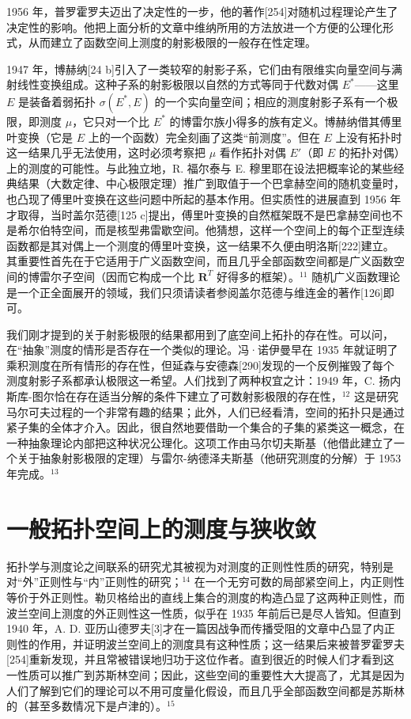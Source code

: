 1956 年，普罗霍罗夫迈出了决定性的一步，他的著作{[}254{]}对随机过程理论产生了决定性的影响。他把上面分析的文章中维纳所用的方法放进一个方便的公理化形式，从而建立了函数空间上测度的射影极限的一般存在性定理。

1947 年，博赫纳{[}24 b{]}引入了一类较窄的射影子系，它们由有限维实向量空间与满射线性变换组成。这种子系的射影极限以自然的方式等同于代数对偶 \(E^*\)——这里 \(E\) 是装备着弱拓扑 \(\sigma(E^*, E)\) 的一个实向量空间；相应的测度射影子系有一个极限，即测度 \(\mu\)，它只对一个比 \(E^*\) 的博雷尔族小得多的族有定义。博赫纳借其傅里叶变换（它是 \(E\) 上的一个函数）完全刻画了这类“前测度”。但在 \(E\) 上没有拓扑时这一结果几乎无法使用，这时必须考察把 \(\mu\) 看作拓扑对偶 \(E'\)（即 \(E\) 的拓扑对偶）上的测度的可能性。与此独立地，R. 福尔泰与 E. 穆里耶在设法把概率论的某些经典结果（大数定律、中心极限定理）推广到取值于一个巴拿赫空间的随机变量时，也凸现了傅里叶变换在这些问题中所起的基本作用。但实质性的进展直到 1956 年才取得，当时盖尔范德{[}125 c{]}提出，傅里叶变换的自然框架既不是巴拿赫空间也不是希尔伯特空间，而是核型弗雷歇空间。他猜想，这样一个空间上的每个正型连续函数都是其对偶上一个测度的傅里叶变换，这一结果不久便由明洛斯{[}222{]}建立。其重要性首先在于它适用于广义函数空间，而且几乎全部函数空间都是广义函数空间的博雷尔子空间（因而它构成一个比 \(\mathbf{R}^T\) 好得多的框架）。\(^{11}\) 随机广义函数理论是一个正全面展开的领域，我们只须请读者参阅盖尔范德与维连金的著作{[}126{]}即可。

我们刚才提到的关于射影极限的结果都用到了底空间上拓扑的存在性。可以问，在“抽象”测度的情形是否存在一个类似的理论。冯·诺伊曼早在 1935 年就证明了乘积测度在所有情形的存在性，但延森与安德森{[}290{]}发现的一个反例摧毁了每个测度射影子系都承认极限这一希望。人们找到了两种权宜之计：1949 年，C. 扬内斯库-图尔恰在存在适当分解的条件下建立了可数射影极限的存在性，\(^{12}\) 这是研究马尔可夫过程的一个非常有趣的结果；此外，人们已经看清，空间的拓扑只是通过紧子集的全体才介入。因此，很自然地要借助一个集合的子集的紧类这一概念，在一种抽象理论内部把这种状况公理化。这项工作由马尔切夫斯基（他借此建立了一个关于抽象射影极限的定理）与雷尔-纳德泽夫斯基（他研究测度的分解）于 1953 年完成。\(^{13}\)

\section*{一般拓扑空间上的测度与狭收敛}
{}

拓扑学与测度论之间联系的研究尤其被视为对测度的正则性性质的研究，特别是对“外”正则性与“内”正则性的研究；\(^{14}\) 在一个无穷可数的局部紧空间上，内正则性等价于外正则性。勒贝格给出的直线上集合的测度的构造凸显了这两种正则性，而波兰空间上测度的外正则性这一性质，似乎在 1935 年前后已是尽人皆知。但直到 1940 年，A. D. 亚历山德罗夫{[}3{]}才在一篇因战争而传播受阻的文章中凸显了内正则性的作用，并证明波兰空间上的测度具有这种性质；这一结果后来被普罗霍罗夫{[}254{]}重新发现，并且常被错误地归功于这位作者。直到很近的时候人们才看到这一性质可以推广到苏斯林空间；因此，这些空间的重要性大大提高了，尤其是因为人们了解到它们的理论可以不用可度量化假设，而且几乎全部函数空间都是苏斯林的（甚至多数情况下是卢津的）。\(^{15}\)

